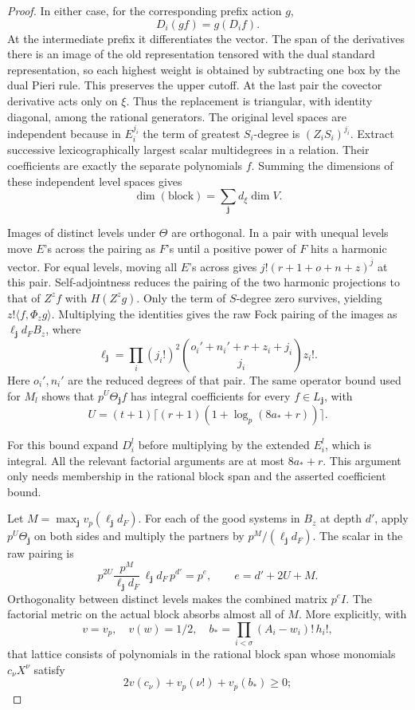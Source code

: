 \begin{proof}
In either case, for the corresponding prefix action \(g\),
\[
 D_i(gf)=g(D_i f).
\]
At the intermediate prefix
it differentiates the vector. The span of the derivatives there
is an image of the old representation tensored with the dual
standard representation, so each highest weight is obtained by
subtracting one box by the dual Pieri rule. This preserves the
upper cutoff. At the last pair the covector derivative acts only
on \(\xi\). Thus the replacement is triangular, with identity
diagonal, among the rational generators. The original level spaces
are independent because in \(E_i^{j_i}\) the term of greatest \(S_i\)-degree
is \((Z_i S_i)^{j_i}\). Extract successive lexicographically
largest scalar multidegrees in a relation. Their coefficients are
exactly the separate polynomials \(f\). Summing the dimensions of these independent level spaces gives
\[
 \dim(\text{block})=\sum_{\mathbf j}d_\xi\dim V.
\]


Images of distinct levels under \(\Theta\) are orthogonal. In a
pair with unequal levels move \(E\)'s across the pairing as
\(F\)'s until a positive power of \(F\) hits a harmonic vector.
For equal levels, moving all \(E\)'s across gives
\(j!(r+1+o+n+z)^{\overline{j}}\) at this pair. Self-adjointness
reduces the pairing of the two harmonic projections to that of
\(Z^zf\) with \(H(Z^zg)\). Only the term of \(S\)-degree zero
survives, yielding \(z!\langle f,\Phi_z g\rangle\).
Multiplying the identities gives the raw Fock pairing of the images
as \(\ell_{\mathbf j}d_F B_z\), where
\[
 \ell_{\mathbf j}=\prod_i (j_i!)^2
       \binom{o_i'+n_i'+r+z_i+j_i}{j_i} z_i!.
\]
Here \(o_i',n_i'\) are the reduced degrees of that pair.
The same operator bound used for \(M_l\) shows that
\(p^U\Theta_{\mathbf j}f\) has integral coefficients for every
\(f\in L_{\mathbf j}\), with
\[
 U=(t+1)\lceil (r+1)(1+\log_p(8a_*+r))\rceil.
\]

For this bound expand \(D_i^l\) before multiplying by the
extended \(E_i^l\), which is integral. All the relevant
factorial arguments are at most \(8a_*+r\).
This argument only needs membership in the rational block span
and the asserted coefficient bound.

Let \(M=\max_{\mathbf j}v_p(\ell_{\mathbf j}d_F)\).
For each of the good systems in \(B_z\) at depth \(d'\), apply
\(p^U\Theta_{\mathbf j}\) on both sides and multiply the partners
by \(p^M/(\ell_{\mathbf j}d_F)\). The scalar in the raw pairing is
\[
 p^{2U}\frac{p^M}{\ell_{\mathbf j}d_F}\,\ell_{\mathbf j}d_F\,p^{d'}=p^e,\qquad e=d'+2U+M.
\]
Orthogonality between distinct levels makes the combined matrix \(p^eI\). The factorial metric on the actual
block absorbs almost all of \(M\). More explicitly, with
\[
 v=v_p,\quad v(w)=1/2,\quad
 b_*=\prod_{i<\sigma}(A_i-w_i)!\,h_i!,
\]
that lattice consists of polynomials in the rational block span
whose monomials \(c_\nu X^\nu\) satisfy
\[
 2v(c_\nu)+v_p(\nu!)+v_p(b_*)\ge0;
\]


\end{proof}
